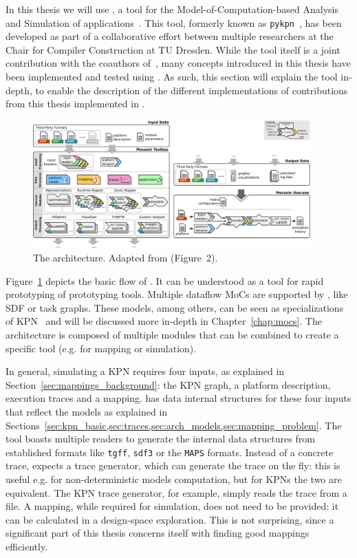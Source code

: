

In this thesis we will use \mocasin, a tool for the Model-of-Computation-based Analysis and Simulation of applications~\cite{menard_rapido21}.
This tool, formerly known as \texttt{pykpn}~\cite{goens_mcsoc18}, has been developed as part of a collaborative effort between multiple researchers at the Chair for Compiler Construction at TU Dresden.
While the tool itself is a joint contribution with the coauthors of~\cite{menard_rapido21}, many concepts introduced in this thesis have been implemented and tested using \mocasin.
As such, this section will explain the tool in-depth, to enable the description of the different implementations of contributions from this thesis implemented in \mocasin.

\begin{figure}[h]
	\centering
   \includegraphics[width=0.95\textwidth]{figures/mocasin.pdf}
	\caption{The \mocasin architecture. Adapted from \cite{menard_rapido21} (Figure~2).}
	\label{fig:mocasin_arch}
\end{figure}


Figure~\ref{fig:mocasin_arch} depicts the basic flow of \mocasin.
It can be understood as a tool for rapid prototyping of prototyping tools.
Multiple dataflow \acp{MoC} are supported by \mocasin, like \ac{SDF} or task graphs.
These models, among others, can be seen as specializations of \ac{KPN}~\cite{lee1995dataflow} and will be discussed more in-depth in Chapter~\ref{chap:mocs}.
The \mocasin architecture is composed of multiple modules that can be combined to create a specific tool (e.g. for mapping or simulation). 

In general, simulating a KPN requires four inputs, as explained in Section~\ref{sec:mappings_background}: the KPN graph, a platform description, execution traces and a mapping.
\mocasin has data internal structures for these four inputs that reflect the models as explained in Sections~\ref{sec:kpn_basic,sec:traces,sec:arch_models,sec:mapping_problem}.
The tool boasts multiple readers to generate the internal data structures from established formats like \texttt{tgff}, \texttt{sdf3} or the \texttt{MAPS} formats.
Instead of a concrete trace, \mocasin expects a trace generator, which can generate the trace on the fly: this is useful e.g. for non-deterministic models computation, but for KPNs the two are equivalent.
The \ac{KPN} trace generator, for example, simply reads the trace from a file.
A mapping, while required for simulation, does not need to be provided: it can be calculated in a design-space exploration.
This is not surprising, since a significant part of this thesis concerns itself with finding good mappings efficiently.

